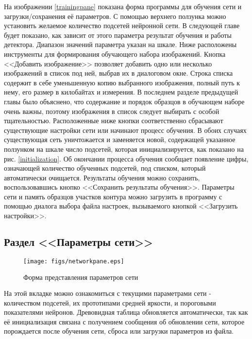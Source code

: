 \documentclass[a4paper,12pt]{report}
\begin{document}
На изображении \ref{trainingpane} показана форма программы для обучения сети и загрузки/сохранения её параметров. С помощью верхнего ползунка можно установить желаемое количество подсетей нейронной сети. В следующей главе будет показано, как зависит от этого параметра результат обучения и работы детектора. Диапазон значений параметра указан на шкале. Ниже расположены инструменты для формирования обучающего набора изображений. Кнопка <<Добавить изображение>> позволяет добавить одно или несколько изображений в список под ней, выбрав их в диалоговом окне. Строка списка содержит в себе уменьшенную копию выбранного изображения, полный путь к нему, его размер в килобайтах и измерения. В последнем разделе предыдущей главы было объяснено, что содержание и порядок образцов в обучающем наборе очень важны, поэтому изображения в список следует выбирать с особой тщательностью. Расположенные ниже кнопки соответственно сбрасывают существующие настройки сети или начинают процесс обучения. В обоих случаях существующая сеть уничтожается и заменяется новой, содержащей указанное ползунком на шкале число подсетей, которая инициализируется, как показано на рис. \ref{initialization}. Об окончании процесса обучения сообщает появление цифры, означающей количество обученных подсетей, под списком, который автоматически очищается. Результаты обучения можно сохранить, воспользовавшись кнопко <<Сохранить результаты обучения>>. Параметры сети и память образцов участков контура можно загрузить в программу с помощью диалога выбора файла настроек, вызываемого кнопкой <<Загрузить настройки>>.
 
\subsection{Раздел <<Параметры сети>>}
\begin{center}
\begin{figure}[h]
\begin{center}
\texttt{[image: figs/networkpane.eps]}
\end{center}\caption{Форма представления параметров сети}
\label{networkpane}
\end{figure}
\end{center}

На этой вкладке можно ознакомиться с текущими параметрами сети - количеством подсетей, их прототипами средней яркости, и пороговыми показателями нейронов. Древовидная таблица обновляется автоматически, так как её инициализация связана с получением сообщения об обновлении сети, которое порождается после обучения сети, сброса или загрузки параметров из файла.  
\end{document}

